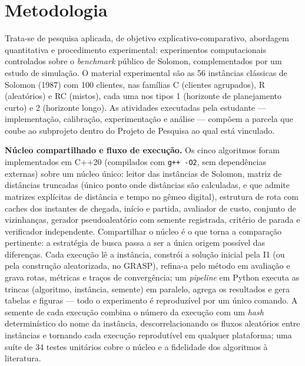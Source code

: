 \documentclass[10pt,a4paper]{article}
\begin{document}
\section{Metodologia}
Trata-se de pesquisa aplicada, de objetivo explicativo-comparativo, abordagem quantitativa e procedimento experimental: experimentos computacionais controlados sobre o \textit{benchmark} público de Solomon, complementados por um estudo de simulação. O material experimental são as 56 instâncias clássicas de Solomon (1987) com 100 clientes, nas famílias C (clientes agrupados), R (aleatórios) e RC (mistos), cada uma nos tipos 1 (horizonte de planejamento curto) e 2 (horizonte longo). As atividades executadas pela estudante --- implementação, calibração, experimentação e análise --- compõem a parcela que coube ao subprojeto dentro do Projeto de Pesquisa ao qual está vinculado.

\vspace{\baselineskip}
\textbf{Núcleo compartilhado e fluxo de execução.} Os cinco algoritmos foram implementados em C++20 (compilados com \texttt{g++ -O2}, sem dependências externas) sobre um núcleo único: leitor das instâncias de Solomon, matriz de distâncias truncadas (único ponto onde distâncias são calculadas, e que admite matrizes explícitas de distância e tempo no gêmeo digital), estrutura de rota com caches dos instantes de chegada, início e partida, avaliador de custo, conjunto de vizinhanças, gerador pseudoaleatório com semente registrada, critério de parada e verificador independente. Compartilhar o núcleo é o que torna a comparação pertinente: a estratégia de busca passa a ser a única origem possível das diferenças. Cada execução lê a instância, constrói a solução inicial pela I1 (ou pela construção aleatorizada, no GRASP), refina-a pelo método em avaliação e grava rotas, métricas e traços de convergência; um \textit{pipeline} em Python executa as trincas (algoritmo, instância, semente) em paralelo, agrega os resultados e gera tabelas e figuras --- todo o experimento é reproduzível por um único comando. A semente de cada execução combina o número da execução com um \textit{hash} determinístico do nome da instância, descorrelacionando os fluxos aleatórios entre instâncias e tornando cada execução reprodutível em qualquer plataforma; uma suíte de 34 testes unitários cobre o núcleo e a fidelidade dos algoritmos à literatura.
\end{document}
